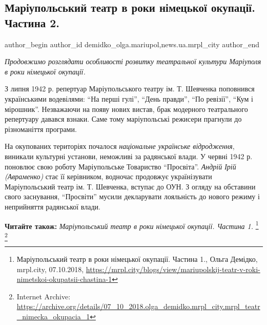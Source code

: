 
 
 
 
 
 
\subsection{Маріупольський театр в роки німецької окупації. Частина 2.}
\label{sec:15_10_2018.stz.news.ua.mrpl_city.1.mrpl_teatr_nimecka_okupacia_2}
 
\ifcmt
 author_begin
   author_id demidko_olga.mariupol,news.ua.mrpl_city
 author_end
\fi

\emph{Продовжимо розглядати особливості розвитку театральної культури Маріуполя в роки німецької окупації.}

З липня 1942 р. репертуар Маріупольського театру ім. Т. Шевченка поповнився
українськими водевілями: \enquote{На перші гулі}, \enquote{День правди},
\enquote{По ревізії}, \enquote{Кум і мірошник}. Незважаючи на появу нових
вистав, брак модерного театрального репертуару давався взнаки. Саме тому
маріупольські режисери прагнули до різноманіття програми.


На окупованих територіях почалося \emph{національне українське відродження}, виникали
культурні установи, неможливі за радянської влади. У червні 1942 р. поновлює
свою роботу Маріупольське Товариство \enquote{Просвіта}. \emph{Андрій Ірій (Авраменко)} стає
її керівником, водночас продовжує українізувати Маріупольський театр ім. Т.
Шевченка, вступає до ОУН. З огляду на обставини свого заснування, \enquote{Просвіти}
мусили декларувати лояльність до нового режиму і неприйняття радянської влади.

\textbf{Читайте також:} \emph{Маріупольський театр в роки німецької окупації. Частина 1.}%
\footnote{Маріупольський театр в роки німецької окупації. Частина 1., Ольга Демідко, mrpl.city, 07.10.2018, \url{https://mrpl.city/blogs/view/mariupolskij-teatr-v-roki-nimetskoi-okupatsii-chastina-1}} %
\footnote{Internet Archive: \url{https://archive.org/details/07_10_2018.olga_demidko.mrpl_city.mrpl_teatr_nimecka_okupacia_1}}


